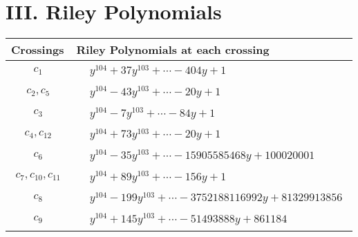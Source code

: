 \documentclass[1p]{elsarticle_modified}
\theoremstyle{definition}
\begin{document}
\centering \section*{ III. Riley Polynomials}
\begin{tabular}{m{50pt}|m{274pt}}
Crossings & \hspace{64pt}Riley Polynomials at each crossing \\
\hline $$\begin{aligned}c_{1}\end{aligned}$$&$\begin{aligned}
&y^{104}+37 y^{103}+\cdots-404 y+1
\end{aligned}$\\
\hline $$\begin{aligned}c_{2},c_{5}\end{aligned}$$&$\begin{aligned}
&y^{104}-43 y^{103}+\cdots-20 y+1
\end{aligned}$\\
\hline $$\begin{aligned}c_{3}\end{aligned}$$&$\begin{aligned}
&y^{104}-7 y^{103}+\cdots-84 y+1
\end{aligned}$\\
\hline $$\begin{aligned}c_{4},c_{12}\end{aligned}$$&$\begin{aligned}
&y^{104}+73 y^{103}+\cdots-20 y+1
\end{aligned}$\\
\hline $$\begin{aligned}c_{6}\end{aligned}$$&$\begin{aligned}
&y^{104}-35 y^{103}+\cdots-15905585468 y+100020001
\end{aligned}$\\
\hline $$\begin{aligned}c_{7},c_{10},c_{11}\end{aligned}$$&$\begin{aligned}
&y^{104}+89 y^{103}+\cdots-156 y+1
\end{aligned}$\\
\hline $$\begin{aligned}c_{8}\end{aligned}$$&$\begin{aligned}
&y^{104}-199 y^{103}+\cdots-3752188116992 y+81329913856
\end{aligned}$\\
\hline $$\begin{aligned}c_{9}\end{aligned}$$&$\begin{aligned}
&y^{104}+145 y^{103}+\cdots-51493888 y+861184
\end{aligned}$\\
\hline
\end{tabular}
\vskip 2pc
\end{document}
